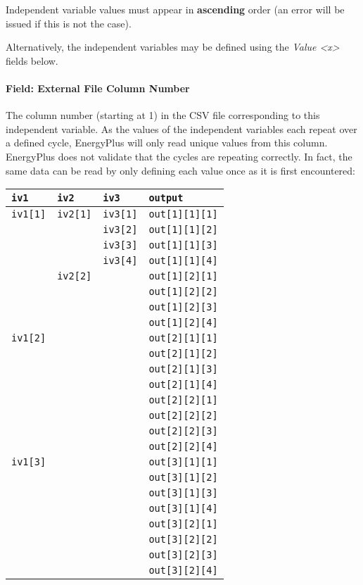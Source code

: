 Independent variable values must appear in \textbf{ascending} order (an
error will be issued if this is not the case).

Alternatively, the independent variables may be defined using the
\emph{Value \textless{}x\textgreater{}} fields below.

\paragraph{Field: External File Column
Number}\label{field-external-file-column-number-1}

The column number (starting at 1) in the CSV file corresponding to this
independent variable. As the values of the independent variables each
repeat over a defined cycle, EnergyPlus will only read unique values
from this column. EnergyPlus does not validate that the cycles are
repeating correctly. In fact, the same data can be read by only defining
each value once as it is first encountered:

\begin{longtable}[]{@{}llll@{}}
\toprule
\texttt{iv1} & \texttt{iv2} & \texttt{iv3} &
\texttt{output}\tabularnewline
\midrule
\endhead
\texttt{iv1{[}1{]}} & \texttt{iv2{[}1{]}} & \texttt{iv3{[}1{]}} &
\texttt{out{[}1{]}{[}1{]}{[}1{]}}\tabularnewline
& & \texttt{iv3{[}2{]}} &
\texttt{out{[}1{]}{[}1{]}{[}2{]}}\tabularnewline
& & \texttt{iv3{[}3{]}} &
\texttt{out{[}1{]}{[}1{]}{[}3{]}}\tabularnewline
& & \texttt{iv3{[}4{]}} &
\texttt{out{[}1{]}{[}1{]}{[}4{]}}\tabularnewline
& \texttt{iv2{[}2{]}} & &
\texttt{out{[}1{]}{[}2{]}{[}1{]}}\tabularnewline
& & & \texttt{out{[}1{]}{[}2{]}{[}2{]}}\tabularnewline
& & & \texttt{out{[}1{]}{[}2{]}{[}3{]}}\tabularnewline
& & & \texttt{out{[}1{]}{[}2{]}{[}4{]}}\tabularnewline
\texttt{iv1{[}2{]}} & & &
\texttt{out{[}2{]}{[}1{]}{[}1{]}}\tabularnewline
& & & \texttt{out{[}2{]}{[}1{]}{[}2{]}}\tabularnewline
& & & \texttt{out{[}2{]}{[}1{]}{[}3{]}}\tabularnewline
& & & \texttt{out{[}2{]}{[}1{]}{[}4{]}}\tabularnewline
& & & \texttt{out{[}2{]}{[}2{]}{[}1{]}}\tabularnewline
& & & \texttt{out{[}2{]}{[}2{]}{[}2{]}}\tabularnewline
& & & \texttt{out{[}2{]}{[}2{]}{[}3{]}}\tabularnewline
& & & \texttt{out{[}2{]}{[}2{]}{[}4{]}}\tabularnewline
\texttt{iv1{[}3{]}} & & &
\texttt{out{[}3{]}{[}1{]}{[}1{]}}\tabularnewline
& & & \texttt{out{[}3{]}{[}1{]}{[}2{]}}\tabularnewline
& & & \texttt{out{[}3{]}{[}1{]}{[}3{]}}\tabularnewline
& & & \texttt{out{[}3{]}{[}1{]}{[}4{]}}\tabularnewline
& & & \texttt{out{[}3{]}{[}2{]}{[}1{]}}\tabularnewline
& & & \texttt{out{[}3{]}{[}2{]}{[}2{]}}\tabularnewline
& & & \texttt{out{[}3{]}{[}2{]}{[}3{]}}\tabularnewline
& & & \texttt{out{[}3{]}{[}2{]}{[}4{]}}\tabularnewline
\bottomrule
\end{longtable}

